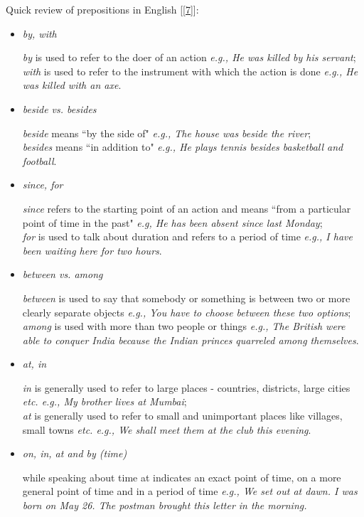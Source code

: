 \documentclass[12pt]{article}
\begin{document}
Quick review of prepositions in English [\ref{7}]:
\begin{itemize}[-]
\item {\it by, with}

{\it by} is used to refer to the doer of an action {\it e.g., He was killed by his servant}; \\
{\it with} is used to refer to the instrument with which the action is done {\it e.g., He was killed with an axe}.

\item {\it beside vs. besides}

{\it beside} means ``by the side of" {\it e.g., The house was beside the river};\\
{\it besides} means ``in addition to" {\it e.g., He plays tennis besides basketball and football}.

\item {\it since, for}

{\it since} refers to the starting point of an action and means ``from a particular point of time in the past" {\it e.g, He has been absent since last Monday};\\
{\it for} is used to talk about duration and refers to a period of time {\it e.g., I have been waiting here for two hours}.

\item {\it between vs. among}

{\it between} is used to say that somebody or something is between two or more clearly separate objects {\it e.g., You have to choose between these two options};\\
{\it among} is used with more than two people or things {\it e.g., The British were able to conquer India because the Indian princes quarreled among themselves}.

\item {\it at, in}

{\it in} is generally used to refer to large places - countries, districts, large cities {\it etc. e.g., My brother lives at Mumbai};\\
{\it at} is generally used to refer to small and unimportant places like villages, small towns {\it etc. e.g., We shall meet them at the club this evening}.

\item {\it on, in, at and by (time)}

while speaking about time at indicates an exact point of time, on a more general point of time and in a period of time {\it e.g., We set out at dawn. I was born on May 26. The postman brought this letter in the morning.}


\end{itemize}
\end{document}
